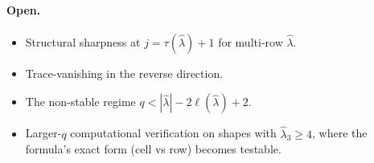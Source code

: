 \documentclass[11pt]{article}
\theoremstyle{definition}
\newcommand{\hatl}{\widehat\lambda}
\newcommand{\elh}{\ell(\hatl)}
\begin{document}
\paragraph{Open.}
\begin{itemize}[topsep=0.3em,itemsep=0.1em]
\item Structural sharpness at $j = \tau(\hatl) + 1$ for multi-row $\hatl$.
\item Trace-vanishing in the reverse direction.
\item The non-stable regime $q < |\hatl| - 2\elh + 2$.
\item Larger-$q$ computational verification on shapes with $\hatl_3
   \ge 4$, where the formula's exact form (cell vs row) becomes
   testable.
\end{itemize}
\end{document}
